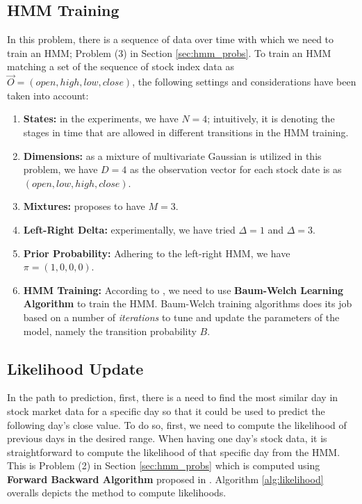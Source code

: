 \documentclass{acm_proc_article-sp}
\begin{document}
\subsection{HMM Training} \label{sec:train}
In this problem, there is a sequence of data over time with which we need to train an HMM; Problem (3) in Section
\ref{sec:hmm_probs}. To train an HMM matching a set of the sequence of stock index data as $\vec{O} = (open, high, low,
close)$, the following settings and considerations have been taken into account:
\begin{enumerate}
  \item \textbf{States:} in the experiments, we have $N = 4$; intuitively, it is denoting the stages in time that are
  allowed in different transitions in the HMM training.
  \item \textbf{Dimensions:} as a mixture of multivariate Gaussian is utilized in this problem, we have $D = 4$ as the
  observation vector for each stock date is as $(open, low, high, close)$.
  \item \textbf{Mixtures:} \cite{hassan:hmm_stock} proposes to have $M = 3$.
  \item \textbf{Left-Right Delta:} experimentally, we have tried $\Delta = 1$ and $\Delta = 3$.
  \item \textbf{Prior Probability:} Adhering to the left-right HMM, we have $\pi = (1, 0, 0, 0)$.
  \item \textbf{HMM Training:} According to \cite{hassan:hmm_stock,rabiner:hmm}, we need to use \textbf{Baum-Welch
  Learning Algorithm} to train the HMM. Baum-Welch training algorithms does its job based on a number of
  \textit{iterations} to tune and update the parameters of the model, namely the transition probability $B$. 
\end{enumerate}

\subsection{Likelihood Update} \label{sec:likelihood}
In the path to prediction, first, there is a need to find the most similar day in stock market data for a specific day
so that it could be used to predict the following day's close value. To do so, first, we need to compute the
likelihood of previous days in the desired range. When having one day's stock data, it is straightforward to compute
the likelihood of that specific day from the HMM. This is Problem (2) in Section \ref{sec:hmm_probs} which is computed using
\textbf{Forward Backward Algorithm} proposed in \cite{rabiner:hmm,erwin:datamining,wiki:hmm}. Algorithm
\ref{alg:likelihood} overalls depicts the method to compute likelihoods.
\end{document}
